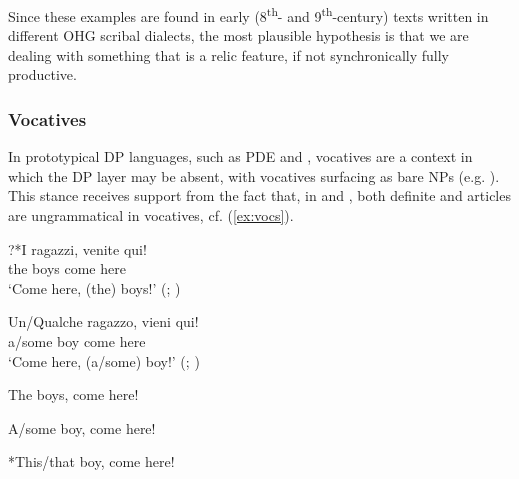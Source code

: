\documentclass[output=paper,colorlinks,citecolor=brown]{langscibook}
\begin{document}
Since these examples are found in early (8\textsuperscript{th}- and 9\textsuperscript{th}-century) texts written in different OHG scribal dialects, the most plausible hypothesis is that we are dealing with something that is a relic feature, if not synchronically fully productive.

\subsubsection{Vocatives}\label{sec:9:voc}

In prototypical DP languages, such as PDE and , vocatives are a context in which the DP layer may be absent, with vocatives surfacing as bare NPs (e.g. \citealp[626--627, note 20]{longobardi1994reference}). This stance receives support from the fact that, in  and , both definite and  articles are ungrammatical in vocatives, cf. (\ref{ex:vocs}).

\begin{exe}     
 \ex\label{ex:vocs}
 \begin{xlist}
     \ex\gll ?*I ragazzi, venite qui!\\
     \phantom{?*}the boys come here\\
     \glt \phantom{?*}`Come here, (the) boys!' (; \citealp[626]{longobardi1994reference})
     
     \ex\gll *Un/Qualche ragazzo, vieni qui!\\
     \phantom{*}a/some boy come here\\
     \glt \phantom{*}`Come here, (a/some) boy!' (; \citealp[627]{longobardi1994reference})
     
     \ex *The boys, come here!
     
     \ex *A/some boy, come here!
     
     \ex \label{ex:vocse} *This/that boy, come here!
 \end{xlist}
\end{exe}     
\end{document}
